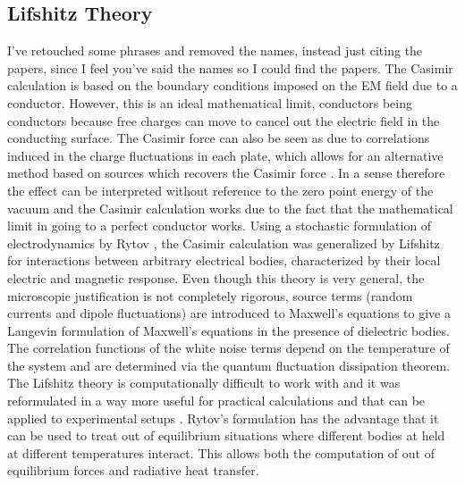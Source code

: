 \subsection{Lifshitz Theory}
{\color{red} I've retouched some phrases and removed the names, instead just citing the papers, since I feel you've said the names so I could find the papers. }
The Casimir calculation is based on the boundary conditions imposed on the EM field 
due to a conductor. However, this is an ideal mathematical limit, conductors being conductors because free charges can move to cancel out the electric field in the conducting surface.
The Casimir force can also be seen as due to correlations induced in the charge fluctuations in each plate, which allows for an alternative method based on sources which recovers the Casimir force \cite{julian_schwinger_casimir_1978,schwinger_casimir_1992}. In a sense therefore the effect can be interpreted without reference to the zero point energy of the vacuum and the Casimir calculation works due to the fact that the mathematical limit in going to a perfect conductor works. 
Using a stochastic formulation of electrodynamics by Rytov \cite{sm_rytov_principles_1989}, the Casimir calculation was generalized by Lifshitz for interactions between arbitrary electrical bodies, characterized by their local electric and magnetic response\cite{lifshits_theory_1955}. 
Even though this theory is very general, the microscopic justification is not completely rigorous, source terms (random currents and dipole fluctuations) are introduced to Maxwell's equations to give a Langevin formulation of Maxwell's equations in the presence of dielectric bodies. The correlation functions of the white noise terms depend on the temperature of the system and are determined via the quantum fluctuation dissipation theorem. The Lifshitz theory is computationally difficult to work with and it was reformulated in a way more useful for practical calculations and that can be applied to experimental setups \cite{van_kampen_macroscopic_1968,ninham_van_1970}.
Rytov's formulation has the advantage that it can be used to treat out of equilibrium situations where different bodies at held at different temperatures interact. This allows both the computation of out of equilibrium forces and radiative heat transfer. 

